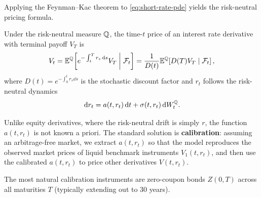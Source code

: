 Applying the Feynman--Kac theorem to \eqref{eq:short-rate-pde} yields the risk-neutral pricing formula.
\begin{theorem}\label{thm:short-rate-feynman-kac}
    Under the risk-neutral measure $\mathbb{Q}$, the time-$t$ price of an interest rate derivative with terminal payoff $V_T$ is
    \[
    V_t = \mathbb{E}^{\mathbb{Q}}\!\left[e^{-\int_t^T r_s\,\mathrm{d} s} V_T \;\middle|\; \mathcal{F}_t\right] = \frac{1}{D(t)}\mathbb{E}^{\mathbb{Q}}\!\left[D(T) V_T \;\middle|\; \mathcal{F}_t\right],
    \]
    where $D(t) = e^{-\int_0^t r_s\dd s}$ is the stochastic discount factor and $r_t$ follows the risk-neutral dynamics
    \[
    \,\mathrm{d} r_t = a(t, r_t)\,\mathrm{d} t + \sigma(t, r_t)\,\mathrm{d} W_t^{\mathbb{Q}}.
    \]
\end{theorem}
\begin{note}
    Unlike equity derivatives, where the risk-neutral drift is simply $r$, the function $a(t, r_t)$ is not known a priori. The standard solution is \textbf{calibration}: assuming an arbitrage-free market, we extract $a(t, r_t)$ so that the model reproduces the observed market prices of liquid benchmark instruments $V_1(t, r_t)$, and then use the calibrated $a(t, r_t)$ to price other derivatives $V(t, r_t)$.

    The most natural calibration instruments are zero-coupon bonds $Z(0, T)$ across all maturities $T$ (typically extending out to $30$ years).
\end{note}


